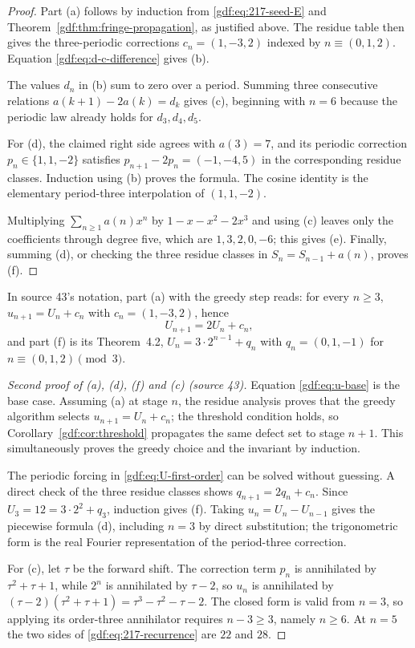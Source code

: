 \documentclass[11pt,a4paper]{article}
\numberwithin{equation}{section}
\theoremstyle{definition}
\theoremstyle{remark}
\theoremstyle{plain}
\newcommand{\src}[1]{\textup{(source #1)}}
\begin{document}
\begin{proof}
Part (a) follows by induction from \eqref{gdf:eq:217-seed-E} and
Theorem~\ref{gdf:thm:fringe-propagation}, as justified above.  The residue table
then gives the three-periodic corrections $c_n=(1,-3,2)$ indexed by
$n\equiv(0,1,2)$.  Equation \eqref{gdf:eq:d-c-difference} gives (b).

The values $d_n$ in (b) sum to zero over a period.  Summing three consecutive
relations $a(k+1)-2a(k)=d_k$ gives (c), beginning with $n=6$ because the
periodic law already holds for $d_3,d_4,d_5$.

For (d), the claimed right side agrees with $a(3)=7$, and its periodic
correction $p_n\in\{1,1,-2\}$ satisfies
$p_{n+1}-2p_n=(-1,-4,5)$ in the corresponding residue classes.  Induction
using (b) proves the formula.  The cosine identity is the elementary
period-three interpolation of $(1,1,-2)$.

Multiplying $\sum_{n\ge1}a(n)x^n$ by
$1-x-x^2-2x^3$ and using (c) leaves only the coefficients through degree five,
which are $1,3,2,0,-6$; this gives (e).  Finally, summing (d), or checking the
three residue classes in $S_n=S_{n-1}+a(n)$, proves (f).
\end{proof}

In source 43's notation, part (a) with the greedy step reads: for every
$n\ge3$, $u_{n+1}=U_n+c_n$ with $c_n=(1,-3,2)$, hence
\begin{equation}\label{gdf:eq:U-first-order}
 U_{n+1}=2U_n+c_n,
\end{equation}
and part (f) is its Theorem~4.2, $U_n=3\cdot2^{n-1}+q_n$ with
$q_n=(0,1,-1)$ for $n\equiv(0,1,2)\pmod3$.

\begin{proof}[Second proof of (a), (d), (f) and (c) \src{43}]
Equation \eqref{gdf:eq:u-base} is the base case.  Assuming (a) at stage $n$,
the residue analysis proves that the greedy algorithm selects
$u_{n+1}=U_n+c_n$; the threshold condition holds, so
Corollary~\ref{gdf:cor:threshold} propagates the same defect set to stage
$n+1$.  This simultaneously proves the greedy choice and the invariant by
induction.

The periodic forcing in \eqref{gdf:eq:U-first-order} can be solved without
guessing.  A direct check of the three residue classes shows
$q_{n+1}=2q_n+c_n$.  Since $U_3=12=3\cdot2^2+q_3$, induction gives (f).
Taking $u_n=U_n-U_{n-1}$ gives the piecewise formula (d), including $n=3$ by
direct substitution; the trigonometric form is the real Fourier
representation of the period-three correction.

For (c), let $\tau$ be the forward shift.  The correction term $p_n$ is
annihilated by $\tau^2+\tau+1$, while $2^n$ is annihilated by $\tau-2$, so
$u_n$ is annihilated by $(\tau-2)(\tau^2+\tau+1)=\tau^3-\tau^2-\tau-2$.  The
closed form is valid from $n=3$, so applying its order-three annihilator
requires $n-3\ge3$, namely $n\ge6$.  At $n=5$ the two sides of
\eqref{gdf:eq:217-recurrence} are $22$ and $28$.
\end{proof}
\end{document}
